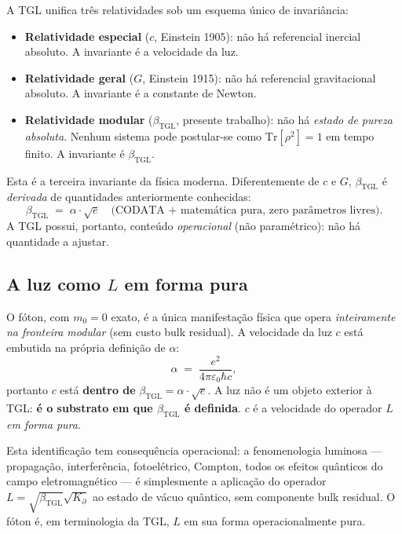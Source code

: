 \documentclass[12pt,a4paper]{article}
\newcommand{\betatgl}{\beta_{\text{TGL}}}
\newcommand{\Kpartial}{K_{\partial}}
\newcommand{\TGL}{\textsc{TGL}}
\begin{document}
A \TGL{} unifica três relatividades sob um esquema único de invariância:
\begin{itemize}[leftmargin=*]
\item \textbf{Relatividade especial} ($c$, Einstein 1905): não há
referencial inercial absoluto.  A invariante é a velocidade da luz.
\item \textbf{Relatividade geral} ($G$, Einstein 1915): não há
referencial gravitacional absoluto.  A invariante é a constante de
Newton.
\item \textbf{Relatividade modular} ($\betatgl$, presente trabalho):
não há \emph{estado de pureza absoluta}.  Nenhum sistema pode
postular-se como $\mathrm{Tr}[\rho^{2}] = 1$ em tempo finito.  A
invariante é $\betatgl$.
\end{itemize}
Esta é a terceira invariante da física moderna.  Diferentemente de $c$
e $G$, $\betatgl$ é \emph{derivada} de quantidades anteriormente
conhecidas:
\begin{equation}
\betatgl \;=\; \alpha \cdot \sqrt{e}
\quad \text{(CODATA + matemática pura, zero parâmetros livres)}.
\end{equation}
A \TGL{} possui, portanto, conteúdo \emph{operacional} (não paramétrico):
não há quantidade a ajustar.

\subsection{A luz como $L$ em forma pura}
\label{subsec:luz_pura}

O fóton, com $m_{0} = 0$ exato, é a única manifestação física que opera
\emph{inteiramente na fronteira modular} (sem custo bulk residual).  A
velocidade da luz $c$ está embutida na própria definição de $\alpha$:
\begin{equation}
\alpha \;=\; \frac{e^{2}}{4\pi \varepsilon_{0} \hbar c},
\end{equation}
portanto $c$ está \textbf{dentro de} $\betatgl = \alpha \cdot \sqrt{e}$.
A luz não é um objeto exterior à \TGL{}: \textbf{é o substrato em que
$\betatgl$ é definida}.  $c$ é a velocidade do operador $L$ \emph{em
forma pura}.

Esta identificação tem consequência operacional: a fenomenologia
luminosa --- propagação, interferência, fotoelétrico, Compton, todos os
efeitos quânticos do campo eletromagnético --- é simplesmente a aplicação
do operador $L = \sqrt{\betatgl}\sqrt{\Kpartial}$ ao estado de vácuo
quântico, sem componente bulk residual.  O fóton é, em terminologia da
\TGL{}, $L$ em sua forma operacionalmente pura.
\end{document}
